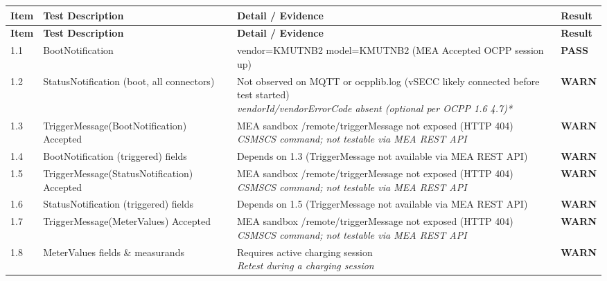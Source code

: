 \documentclass[10pt, a4paper]{article}
\begin{document}
\renewcommand{\arraystretch}{1.35}
\begin{longtable}{|L{1cm}|L{5.5cm}|M{7cm}|C{1.8cm}|}
\hline
{}
\textbf{Item} & \small\textbf{Test Description} & \small\textbf{Detail / Evidence} & \small\textbf{Result} \\
\hline
\endfirsthead
\hline
{}
\textbf{Item} & \small\textbf{Test Description} & \small\textbf{Detail / Evidence} & \small\textbf{Result} \\
\hline
\endhead
\hline
\endfoot
\small 1.1 & \small BootNotification & vendor=KMUTNB2 model=KMUTNB2 (MEA Accepted  OCPP session up) & \textcolor{passgreen}{\textbf{PASS}} \\
\hline
\small 1.2 & \small StatusNotification (boot, all connectors) & Not observed on MQTT or ocpplib.log (vSECC likely connected before test started){\newline\normalfont\footnotesize\itshape vendorId/vendorErrorCode absent (optional per OCPP 1.6 4.7)*} & \textcolor{warnorange}{\textbf{WARN}} \\
\hline
\small 1.3 & \small TriggerMessage(BootNotification)  Accepted & MEA sandbox /remote/triggerMessage not exposed (HTTP 404){\newline\normalfont\footnotesize\itshape CSMSCS command; not testable via MEA REST API} & \textcolor{warnorange}{\textbf{WARN}} \\
\hline
\small 1.4 & \small BootNotification (triggered) fields & Depends on 1.3 (TriggerMessage not available via MEA REST API) & \textcolor{warnorange}{\textbf{WARN}} \\
\hline
\small 1.5 & \small TriggerMessage(StatusNotification)  Accepted & MEA sandbox /remote/triggerMessage not exposed (HTTP 404){\newline\normalfont\footnotesize\itshape CSMSCS command; not testable via MEA REST API} & \textcolor{warnorange}{\textbf{WARN}} \\
\hline
\small 1.6 & \small StatusNotification (triggered) fields & Depends on 1.5 (TriggerMessage not available via MEA REST API) & \textcolor{warnorange}{\textbf{WARN}} \\
\hline
\small 1.7 & \small TriggerMessage(MeterValues)  Accepted & MEA sandbox /remote/triggerMessage not exposed (HTTP 404){\newline\normalfont\footnotesize\itshape CSMSCS command; not testable via MEA REST API} & \textcolor{warnorange}{\textbf{WARN}} \\
\hline
\small 1.8 & \small MeterValues fields \& measurands & Requires active charging session{\newline\normalfont\footnotesize\itshape Retest during a charging session} & \textcolor{warnorange}{\textbf{WARN}} \\

\end{longtable}
\end{document}

